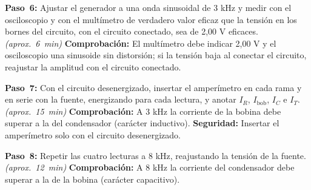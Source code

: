 \documentclass[12pt]{article}
\begin{document}
\begin{pasos}
  \item \textbf{Paso~6:} Ajustar el generador a una onda sinusoidal de 3 kHz y medir con el osciloscopio y con el multímetro de verdadero valor eficaz que la tensión en los bornes del circuito, con el circuito conectado, sea de 2,00 V eficaces. \emph{(aprox.~\SI{6}{\minute})} \textbf{Comprobación:} El multímetro debe indicar 2,00 V y el osciloscopio una sinusoide sin distorsión; si la tensión baja al conectar el circuito, reajustar la amplitud con el circuito conectado.
  \item \textbf{Paso~7:} Con el circuito desenergizado, insertar el amperímetro en cada rama y en serie con la fuente, energizando para cada lectura, y anotar $I_R$, $I_{\mathrm{bob}}$, $I_C$ e $I_T$. \emph{(aprox.~\SI{15}{\minute})} \textbf{Comprobación:} A 3 kHz la corriente de la bobina debe superar a la del condensador (carácter inductivo). \textbf{Seguridad:} Insertar el amperímetro solo con el circuito desenergizado.
  \item \textbf{Paso~8:} Repetir las cuatro lecturas a 8 kHz, reajustando la tensión de la fuente. \emph{(aprox.~\SI{12}{\minute})} \textbf{Comprobación:} A 8 kHz la corriente del condensador debe superar a la de la bobina (carácter capacitivo).
\end{pasos}
\end{document}
